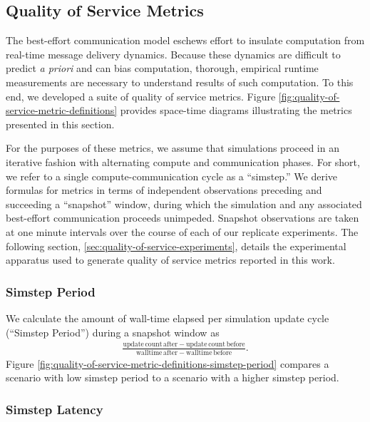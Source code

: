 \subsection{Quality of Service Metrics} \label{sec:quality-of-service-metrics}



The best-effort communication model eschews effort to insulate computation from real-time message delivery dynamics.
Because these dynamics are difficult to predict \textit{a priori} and can bias computation, thorough, empirical runtime measurements are necessary to understand results of such computation.
To this end, we developed a suite of quality of service metrics.
Figure \ref{fig:quality-of-service-metric-definitions} provides space-time diagrams illustrating the metrics presented in this section.

For the purposes of these metrics, we assume that simulations proceed in an iterative fashion with alternating compute and communication phases.
For short, we refer to a single compute-communication cycle as a ``simstep.''
We derive formulas for metrics in terms of independent observations preceding and succeeding a ``snapshot'' window, during which the simulation and any associated best-effort communication proceeds unimpeded.
Snapshot observations are taken at one minute intervals over the course of each of our replicate experiments.
The following section, \ref{sec:quality-of-service-experiments}, details the experimental apparatus used to generate quality of service metrics reported in this work.

\subsubsection{Simstep Period} \label{sec:simstep-period-metric}

We calculate the amount of wall-time elapsed per simulation update cycle (``Simstep Period'') during a snapshot window as
\begin{align*}
\frac{
  \mathrm{update\,count\,after} - \mathrm{update\,count\,before}
}{
  \mathrm{walltime\,after} - \mathrm{walltime\,before}
}.
\end{align*}
Figure \ref{fig:quality-of-service-metric-definitions-simstep-period} compares a scenario with low simstep period to a scenario with a higher simstep period.

\subsubsection{Simstep Latency} \label{sec:wall-time-latency-metric}


